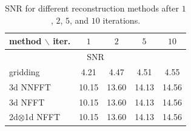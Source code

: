 \documentclass[journal]{IEEEtran}
\numberwithin{equation}{section}
\numberwithin{table}{section}
\numberwithin{figure}{section}
\begin{document}
\begin{table}[ht]
\begin{center}
\begin{tabular}{|l||c|c|c|c|} \hline
 \rule{0mm}{4mm} method $\backslash$ iter. & $1$ & $2$  & $5$  & $10$   \\[1ex] \hline\hline
 \multicolumn{5}{|c|}{\rule{0mm}{4mm} SNR}\\[1ex] \hline\hline
 \rule{0mm}{4mm} gridding & 4.21 & 4.47 &  4.51 & 4.55  \\[1ex] \hline
 \rule{0mm}{4mm} 3d NNFFT & 10.15 & 13.60 & 14.13 & 14.56  \\[1ex] \hline
 \rule{0mm}{4mm} 3d NFFT & 10.15 & 13.60 & 14.13 & 14.56  \\[1ex] \hline
 \rule{0mm}{4mm} 2d$\otimes$1d NFFT & 10.15 & 13.60 & 14.13 & 14.56\\[1ex] \hline 
\end{tabular}
\end{center}
\caption{SNR for different reconstruction methods after $1$, $2$, $5$, and $10$ iterations.} \label{Tab:1}
\end{table}
\end{document}
